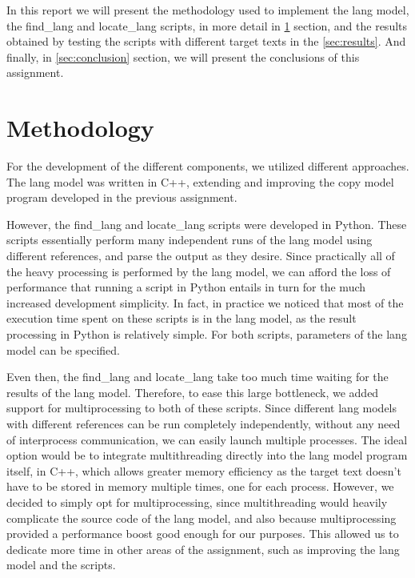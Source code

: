 \documentclass{article}
\begin{document}
In this report we will present the methodology used to implement the lang model, the find_lang and locate_lang scripts, in more detail in \ref*{sec:methodology} section, and the results obtained by testing the scripts with different target texts in the \ref*{sec:results}.
And finally, in \ref*{sec:conclusion} section, we will present the conclusions of this assignment.

\section{Methodology}
\label{sec:methodology}

For the development of the different components, we utilized different approaches.
The lang model was written in C++, extending and improving the copy model program developed in the previous assignment.

However, the find_lang and locate_lang scripts were developed in Python.
These scripts essentially perform many independent runs of the lang model using different references, and parse the output as they desire.
Since practically all of the heavy processing is performed by the lang model, we can afford the loss of performance that running a script in Python entails in turn for the much increased development simplicity.
In fact, in practice we noticed that most of the execution time spent on these scripts is in the lang model, as the result processing in Python is relatively simple.
For both scripts, parameters of the lang model can be specified.

Even then, the find_lang and locate_lang take too much time waiting for the results of the lang model.
Therefore, to ease this large bottleneck, we added support for multiprocessing to both of these scripts.
Since different lang models with different references can be run completely independently, without any need of interprocess communication, we can easily launch multiple processes.
The ideal option would be to integrate multithreading directly into the lang model program itself, in C++, which allows greater memory efficiency as the target text doesn't have to be stored in memory multiple times, one for each process.
However, we decided to simply opt for multiprocessing, since multithreading would heavily complicate the source code of the lang model, and also because multiprocessing provided a performance boost good enough for our purposes.
This allowed us to dedicate more time in other areas of the assignment, such as improving the lang model and the scripts.
\end{document}

